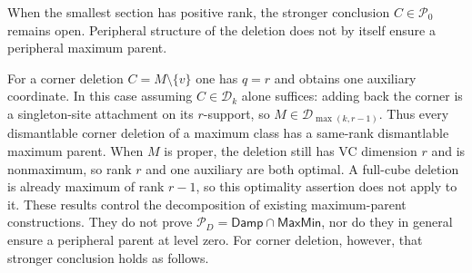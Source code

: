 \documentclass[11pt]{article}
\theoremstyle{definition}
\newcommand{\MaxMin}{\mathsf{MaxMin}}
\newcommand{\Damp}{\mathsf{Damp}}
\begin{document}
When the smallest section has positive rank, the stronger conclusion
$C\in\mathcal P_0$ remains open. Peripheral structure of the deletion
does not by itself ensure a peripheral maximum parent.

For a corner deletion $C=M\setminus\{v\}$ one has $q=r$ and obtains
one auxiliary coordinate. In this case assuming $C\in\mathcal D_k$
alone suffices: adding back the corner is a singleton-site attachment
on its $r$-support, so $M\in\mathcal D_{\max(k,r-1)}$.
Thus every dismantlable corner deletion of a maximum class has a
same-rank dismantlable maximum parent. When $M$ is proper, the deletion
still has VC dimension $r$ and is nonmaximum, so rank $r$ and one
auxiliary are both optimal. A full-cube deletion is already maximum
of rank $r-1$, so this optimality assertion does not apply to it.
These results control the decomposition of existing maximum-parent
constructions. They do not prove $\mathcal P_D=\Damp\cap\MaxMin$,
nor do they in general ensure a peripheral parent at level zero.
For corner deletion, however, that stronger conclusion holds as follows.
\end{document}
